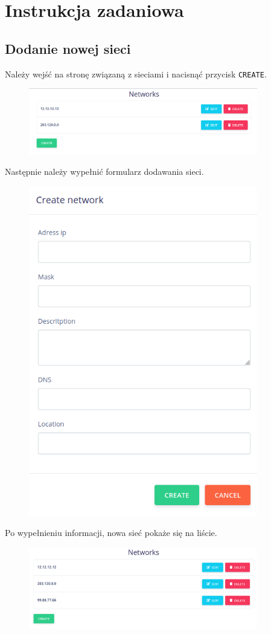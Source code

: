 \documentclass[a4paper,11pt]{article}
\begin{document}
\section{Instrukcja zadaniowa}
\subsection{Dodanie nowej sieci}
Należy wejść na stronę związaną z sieciami i nacisnąć przycisk \texttt{CREATE}.
\begin{figure}[H]
	\centering
	\includegraphics[width=10cm]{intsr01.png}
\end{figure}
Następnie należy wypełnić formularz dodawania sieci.
\begin{figure}[H]
	\centering
	\includegraphics[width=10cm]{instr02.png}
\end{figure}
Po wypełnieniu informacji, nowa sieć pokaże się na liście.
\begin{figure}[H]
	\centering
	\includegraphics[width=10cm]{instr03.png}
\end{figure}
\end{document}
